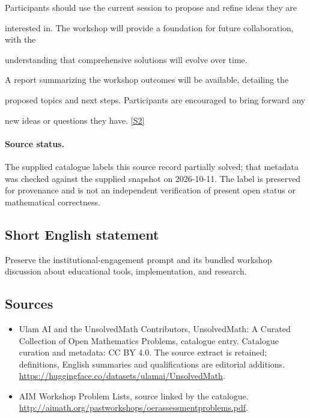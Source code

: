 \documentclass[11pt]{article}
\newcommand{\sref}[2]{\hyperlink{source:#1:#2}{[S#2]}}
\begin{document}
Participants should use the current session to propose and refine ideas they are

interested in. The workshop will provide a foundation for future collaboration, with the

understanding that comprehensive solutions will evolve over time.

A report summarizing the workshop outcomes will be available, detailing the

proposed topics and next steps. Participants are encouraged to bring forward any

new ideas or questions they have. \sref{statement}{2}
\paragraph{Source status.}
The supplied catalogue labels this source record partially solved; that metadata was checked against the supplied snapshot on 2026-10-11. The label is preserved for provenance and is not an independent verification of present open status or mathematical correctness.
\subsection{Short English statement}
Preserve the institutional-engagement prompt and its bundled workshop discussion about educational tools, implementation, and research.
\subsection{Sources}
\begin{itemize}
\item[\hypertarget{source:statement:1}{S1}] Ulam AI and the UnsolvedMath Contributors, UnsolvedMath: A Curated Collection of Open Mathematics Problems, catalogue entry. Catalogue curation and metadata: CC BY 4.0. The source extract is retained; definitions, English summaries and qualifications are editorial additions.
\url{https://huggingface.co/datasets/ulamai/UnsolvedMath}.
\item[\hypertarget{source:statement:2}{S2}] AIM Workshop Problem Lists, source linked by the catalogue.
\url{http://aimath.org/pastworkshops/oerassessmentproblems.pdf}.
\end{itemize}
\end{document}
